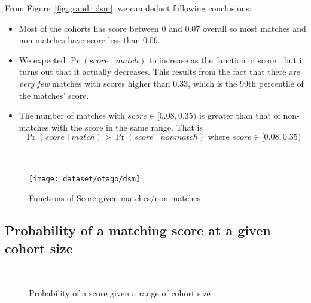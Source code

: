 From Figure~\ref{fig:grand_dsm}, we can deduct following conclusions:
\begin{itemize}
\item Most of the cohorts has score between 0 and 0.07 overall so most matches
and non-matches have score less than 0.06.
\item We expected $\Pr{(score \mid match)}$ to increase as the function of score
, but it turns out that it actually decreases. This results from the fact that
there are \emph{very few} matches with scores higher than 0.33, which is the 99th
percentile of the matches' score.
\item The number of matches with $score \in [0.08, 0.35)$ is greater than that of
non-matches with the score in the same range. That is
$$\Pr{(score \mid match)} > \Pr{(score \mid nonmatch)} \mbox{ where } score\in [0.08, 0.35)$$
\end{itemize}

\begin{figure}[htbp]
  \centering
  \label{fig:otago_psm}\\ %
  \label{fig:otago_csm}\\ %
  {\texttt{[image: dataset/otago/dsm]}}
  \caption{Functions of Score given matches/non-matches}
  \label{fig:otago_dsm} %
\end{figure}


\subsection{Probability of a matching score at a given cohort size}

\begin{figure}[htbp]
  \centering
  \label{fig:grand_pscohort}\\ %
  \caption{Probability of a score given a range of cohort size}
  \label{fig:grand_psnoncohort} %
\end{figure}

